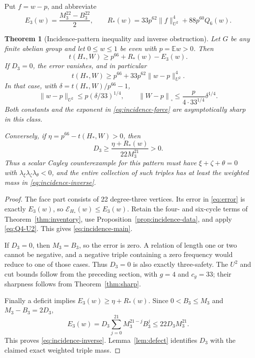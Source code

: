 \documentclass[11pt]{article}
\numberwithin{equation}{section}
\newtheorem{theorem}{Theorem}[section]
\theoremstyle{definition}
\theoremstyle{remark}
\newcommand{\E}{\mathbb E}
\newcommand{\Cut}[1]{\left\|#1\right\|_{\square}}
\newcommand{\Err}{\mathcal E}
\newcommand{\Hstar}{H_{\!*}}
\begin{document}
Put $f=w-p$, and abbreviate
\begin{equation}
 E_3(w)=\frac{M_3^{22}-B_3^{22}}2,
 \qquad
 R_*(w)=33p^{62}\|f\|_{U^2}^4+88p^{60}Q_6(w).
 \label{eq:incidence-error}
\end{equation}

\begin{theorem}[Incidence-pattern inequality and inverse obstruction]
\label{thm:incidence}
Let $G$ be any finite abelian group and let $0\leq w\leq1$ be even with
$p=\E w>0$. Then
\begin{equation}
 \boxed{\quad t(\Hstar,W)\geq p^{66}+R_*(w)-E_3(w).\quad}
 \label{eq:incidence-main}
\end{equation}
If $D_3=0$, the error vanishes, and in particular
\begin{equation}
 t(\Hstar,W)\geq p^{66}+33p^{62}\|w-p\|_{U^2}^4.
 \label{eq:incidence-u2}
\end{equation}
In that case, with $\delta=t(\Hstar,W)/p^{66}-1$,
\begin{equation}
 \|w-p\|_{U^2}\leq p(\delta/33)^{1/4},\qquad
 \Cut{W-p}\leq\frac{p}{4\cdot33^{1/4}}\delta^{1/4}.
 \label{eq:incidence-force}
\end{equation}
Both constants and the exponent in \eqref{eq:incidence-force} are
asymptotically sharp in this class.

Conversely, if $\eta=p^{66}-t(\Hstar,W)>0$, then
\begin{equation}
 \boxed{\quad
 D_3\geq\frac{\eta+R_*(w)}{22M_3^{21}}>0.
 \quad}
 \label{eq:incidence-inverse}
\end{equation}
Thus a scalar Cayley counterexample for this pattern must have
$\xi+\zeta+\theta=0$ with
$\lambda_\xi\lambda_\zeta\lambda_\theta<0$, and the entire collection
of such triples has at least the weighted mass in
\eqref{eq:incidence-inverse}.
\end{theorem}
\begin{proof}
The face part consists of 22 degree-three vertices. Its error in
\eqref{eq:error} is exactly $E_3(w)$, so $\Err_{\Hstar}(w)\leq E_3(w)$.
Retain the four- and six-cycle terms of Theorem~\ref{thm:inventory},
use Proposition~\ref{prop:incidence-data}, and apply
\eqref{eq:Q4-U2}. This gives \eqref{eq:incidence-main}.

If $D_3=0$, then $M_3=B_3$, so the error is zero. A relation of length
one or two cannot be negative, and a negative triple containing a zero
frequency would reduce to one of those cases. Thus $D_3=0$ is also
exactly three-safety. The $U^2$ and cut bounds follow from the preceding
section, with $g=4$ and $c_g=33$; their sharpness follows from
Theorem~\ref{thm:sharp}.

Finally a deficit implies $E_3(w)\geq\eta+R_*(w)$. Since
$0<B_3\leq M_3$ and $M_3-B_3=2D_3$,
\[
 E_3(w)=D_3\sum_{j=0}^{21}M_3^{21-j}B_3^j
       \leq22D_3M_3^{21}.
\]
This proves \eqref{eq:incidence-inverse}. Lemma~\ref{lem:defect}
identifies $D_3$ with the claimed exact weighted triple mass.
\end{proof}
\end{document}
